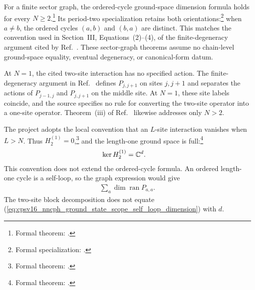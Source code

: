 \documentclass{article}
\begin{document}
For a finite sector graph, the ordered-cycle ground-space dimension formula
holds for every $N\geq2$.\footnote{Formal theorem:
.}
Its period-two specialization retains both orientations:\footnote{Formal
specialization:
.}
when $a\ne b$, the ordered cycles $(a,b)$ and $(b,a)$ are distinct. This
matches the convention used in Section~III, Equations~(2)--(4), of the
finite-degeneracy argument cited by Ref.~\cite{Cirac2016MPDO_arXiv}. These
sector-graph theorems assume no chain-level ground-space equality, eventual
degeneracy, or canonical-form datum.

At $N=1$, the cited two-site interaction has no specified action. The
finite-degeneracy argument in Ref.~\cite{Cirac2016MPDO_arXiv} defines
$P_{j,j+1}$ on sites $j,j+1$ and separates the actions of $P_{j-1,j}$ and
$P_{j,j+1}$ on the middle site. At $N=1$, these site labels coincide, and the
source specifies no rule for converting the two-site operator into a one-site
operator. Theorem~(iii) of Ref.~\cite{Cirac2016MPDO_arXiv}
likewise addresses only $N>2$.

The project adopts the local convention that an $L$-site interaction vanishes
when $L>N$. Thus $H_2^{(1)}=0$,\footnote{Formal theorem:
.} and the length-one ground
space is full:\footnote{Formal theorem:
.}
\begin{align}
    \ker H_2^{(1)}
        &=\mathbb{C}^d.
    \label{eq:cpsv16_nncph_ground_state_scope_one_site_kernel}
\end{align}
This convention does not extend the ordered-cycle formula. An ordered
length-one cycle is a self-loop, so the graph expression would give
\begin{align}
    \sum_a\dim\operatorname{ran}P_{a,a}.
    \label{eq:cpsv16_nncph_ground_state_scope_self_loop_dimension}
\end{align}
The two-site block decomposition does not equate
(\ref{eq:cpsv16_nncph_ground_state_scope_self_loop_dimension}) with $d$.
\end{document}
